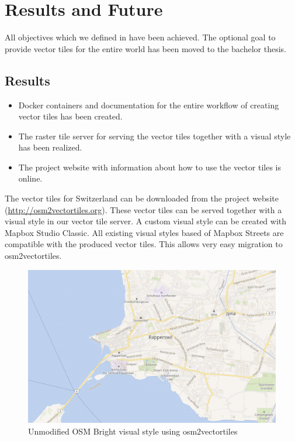 \chapter{Results and Future}\label{part1_results_and_future}

All objectives which we defined in  have been achieved. The optional goal to provide vector tiles for the entire world has been moved to the bachelor thesis.

\section{Results}\label{part1_results}

\begin{itemize}
\item
  Docker containers and documentation for the entire workflow of creating vector tiles has been created.
\item
  The raster tile server for serving the vector tiles together with a visual style has been realized.
\item
  The project website with information about how to use the vector tiles is online.
\end{itemize}

The vector tiles for Switzerland can be downloaded from the project website (\url{http://osm2vectortiles.org}). These vector tiles can be served together with a visual style in our vector tile server.
\newline{}
A custom visual style can be created with Mapbox Studio Classic\cite{mapbox_studio_classic}.
All existing visual styles based of Mapbox Streets are compatible with the produced vector tiles. This allows very easy migration to osm2vectortiles.

\begin{figure}[H]
  \includegraphics[width=1\textwidth]{images/unmodified_osm_bright.png}
  \caption{Unmodified OSM Bright visual style using osm2vectortiles}
\end{figure}

